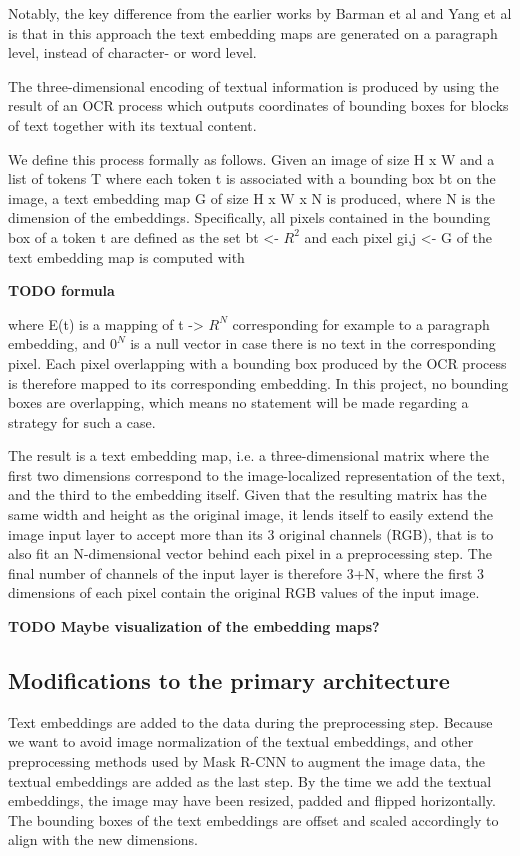 \documentclass[english, bibtex]{kththesis}
\begin{document}
Notably, the key difference from the earlier works by Barman et al and Yang et al is that in this approach the text embedding maps are generated on a paragraph level, instead of character- or word level.

The three-dimensional encoding of textual information is produced by using the result of an OCR process which outputs coordinates of bounding boxes for blocks of text together with its textual content.

We define this process formally as follows. Given an image of size H x W and a list of tokens T where each token t is associated with a bounding box bt on the image, a text embedding map G of size H x W x N is produced, where N is the dimension of the embeddings. Specifically, all pixels contained in the bounding box of a token t are defined as the set bt <- $R^2$ and each pixel gi,j <- G of the text embedding map is computed with 

\textbf{TODO formula}

where E(t) is a mapping of t -> $R^N$ corresponding for example to a paragraph embedding, and $0^N$ is a null vector in case there is no text in the corresponding pixel. Each pixel overlapping with a bounding box produced by the OCR process is therefore mapped to its corresponding embedding. In this project, no bounding boxes are overlapping, which means no statement will be made regarding a strategy for such a case.

The result is a text embedding map, i.e. a three-dimensional matrix where the first two dimensions correspond to the image-localized representation of the text, and the third to the embedding itself. Given that the resulting matrix has the same width and height as the original image, it lends itself to easily extend the image input layer to accept more than its 3 original channels (RGB), that is to also fit an N-dimensional vector behind each pixel in a preprocessing step. The final number of channels of the input layer is therefore 3+N, where the first 3 dimensions of each pixel contain the original RGB values of the input image. 

\textbf{TODO Maybe visualization of the embedding maps?}

\subsection{Modifications to the primary architecture}

Text embeddings are added to the data during the preprocessing step. Because we want to avoid image normalization of the textual embeddings, and other preprocessing methods used by Mask R-CNN to augment the image data, the textual embeddings are added as the last step. By the time we add the textual embeddings, the image may have been resized, padded and flipped horizontally. The bounding boxes of the text embeddings are offset and scaled accordingly to align with the new dimensions.
\end{document}

